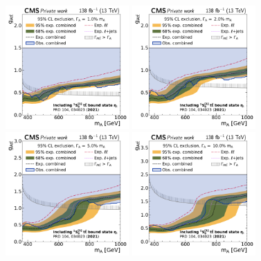 \begin{figure}[!ph]
    \centering
    \includegraphics[width=0.42\textwidth]{figures/ah/limits_combined/etat/A_limit_w1p0_g-scan.pdf}%
    \hspace*{0.05\textwidth}%
    \includegraphics[width=0.42\textwidth]{figures/ah/limits_combined/etat/A_limit_w2p0_g-scan.pdf} \\
    \includegraphics[width=0.42\textwidth]{figures/ah/limits_combined/etat/A_limit_w5p0_g-scan.pdf}%
    \hspace*{0.05\textwidth}%
    \includegraphics[width=0.42\textwidth]{figures/ah/limits_combined/etat/A_limit_w10p0_g-scan.pdf}

\end{figure}
